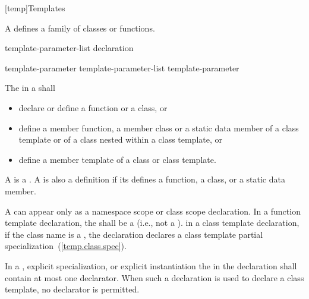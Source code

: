 [temp]{Templates}%


%

\pnum
A  defines a family of classes or functions.

%
%
\begin{bnf}
\br
  \opt {} template-parameter-list \terminal{>} declaration
\end{bnf}

\begin{bnf}
\br
  template-parameter\br
  template-parameter-list \terminal{,} template-parameter
\end{bnf}

The
in a
shall

\begin{itemize}
\item declare or define a function or a class, or

\item define a member function, a member class or a static data member of a
class template or of a class nested within a class template, or

\item define a member template of a class or class template.
\end{itemize}

A  is a .
A  is also a definition
if its  defines a function, a class, or a static data member.

\pnum
A
can appear only as a namespace scope or class scope declaration.
In a function template declaration, the
 shall be a 
(i.e., not a ).
\enternote
in a class template declaration, if the class name is a
,
the declaration declares a class template partial specialization~(\ref{temp.class.spec}).
\exitnote

\pnum
In a
,
explicit specialization, or explicit instantiation the
in the declaration shall contain at most one declarator.
When such a declaration is used to declare a class template,
no declarator is permitted.

